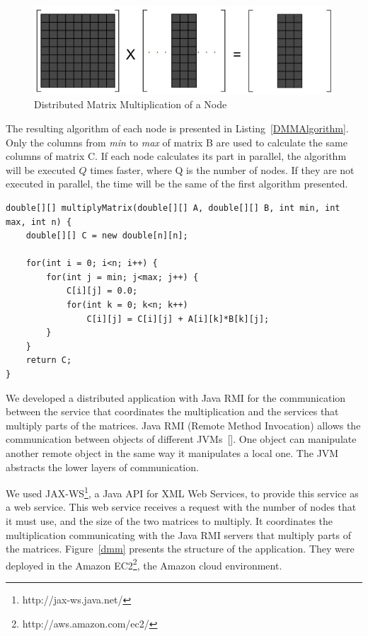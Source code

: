 \begin{figure}[htbp]
\begin{center}
	\includegraphics[scale=0.5]{images/matrices}
\caption{Distributed Matrix Multiplication of a Node}
\label{matrices}
\end{center}
\end{figure}

The resulting algorithm of each node is presented in Listing~\ref{DMMAlgorithm}. Only the columns from \emph{min} to \emph{max} of matrix B are used to calculate the same columns of matrix C. If each node calculates its part in parallel, the algorithm will be executed $Q$ times faster, where Q is the number of nodes. If they are not executed in parallel, the time will be the same of the first algorithm presented.
\clearpage

\begin{lstlisting}
double[][] multiplyMatrix(double[][] A, double[][] B, int min, int max, int n) {
	double[][] C = new double[n][n];
	
	for(int i = 0; i<n; i++) {
		for(int j = min; j<max; j++) {
			C[i][j] = 0.0;
			for(int k = 0; k<n; k++)
				C[i][j] = C[i][j] + A[i][k]*B[k][j];
		}
	}
	return C;
}
\end{lstlisting}

We developed a distributed application with Java RMI for the communication between the service that coordinates the multiplication and the services that multiply parts of the matrices. Java RMI (Remote Method Invocation) allows the communication between objects of different JVMs~[\cite{JavaRMI}]. One object can manipulate another remote object in the same way it manipulates a local one. The JVM abstracts the lower layers of communication.

We used JAX-WS\footnote{http://jax-ws.java.net/}, a Java API for XML Web Services, to provide this service as a web service.  This web service receives a request with the number of nodes that it must use, and the size of the two matrices to multiply. It coordinates the multiplication communicating with the Java RMI servers that multiply parts of the matrices. Figure~\ref{dmm} presents the structure of the application. They were deployed in the Amazon EC2\footnote{http://aws.amazon.com/ec2/}, the Amazon cloud environment.


